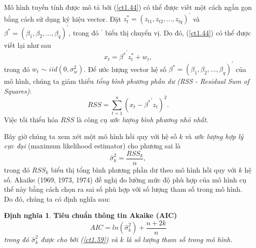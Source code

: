 \documentclass[12pt, a4paper,oneside]{book}
\theoremstyle{definition}
\newtheorem{dn}[theo]{Định nghĩa}
\begin{document}
Mô hình tuyến tính được mô tả bởi (\ref{ct1.44}) có thể được viết một cách ngắn gọn bằng cách sử dụng ký hiệu vector. Đặt $z^{*}_{t}=(z_{t1}, z_{t2}, \dots, z_{tq})^{'}$ và $\beta^{*}=(\beta_{1}, \beta_{2}, \dots, \beta_{q})^{'}$, trong đó $^{'}$ biểu thị chuyển vị. Do đó, (\ref{ct1.44}) có thể được viết lại như sau
\begin{equation}
x_{t}={\beta^{*}}^{'}z^{*}_{t} + w_{t}, \label{ct1.45}
\end{equation}	
trong đó $w_{t}$ $\sim$ $iid(0, \sigma_{w}^{2})$. Để ước lượng  vector hệ số $\beta^{*}=(\beta_{1}, \beta_{2}, \dots, \beta_{q})^{'}$ của mô hình, chúng ta giảm thiểu \textit{tổng bình phương phần dư (RSS - Residual Sum of Squares)}:
\begin{equation}
RSS = \sum_{t=1}^{n}(x_{t}- {\beta^{*}}^{'}z_{t})^{2}. \label{ct1.46}	
\end{equation}
Việc tối thiểu hóa $RSS$ là công cụ\textit{ ước lượng bình phương nhỏ nhất}.

Bây giờ chúng ta xem xét một mô hình hồi quy với hệ số $ k $ và \textit{ước lượng hợp lý cực đại} (maximum likelihood estimator) cho phương sai  là
\begin{equation}
\widehat{\sigma}_{k}^{2}=\dfrac{RSS_{k}}{n}, \label{ct1.59}
\end{equation}
trong đó $ RSS_{k} $ biểu thị tổng bình phương phần dư theo mô hình hồi quy với $ k $ hệ số. Akaike (1969, 1973, 1974) đề nghị đo lường mức độ phù hợp của mô hình cụ thể này bằng cách chọn ra sai số phù hợp với số lượng tham số trong mô hình. Do đó, chúng ta có định nghĩa sau: 
\begin{dn}\cite{1} \textbf{Tiêu chuẩn thông tin Akaike (AIC)}\textit{ 
		\begin{equation}
		AIC= ln (\widehat{\sigma}_{k}^{2}) +\dfrac{n+ 2k}{n} \label{ct1.60}
		\end{equation}
		trong đó $\widehat{\sigma}_{k}^{2} $ được cho bởi (\ref{ct1.59}) và $ k $ là số lượng tham số trong mô hình.}
\end{dn}
\end{document}
